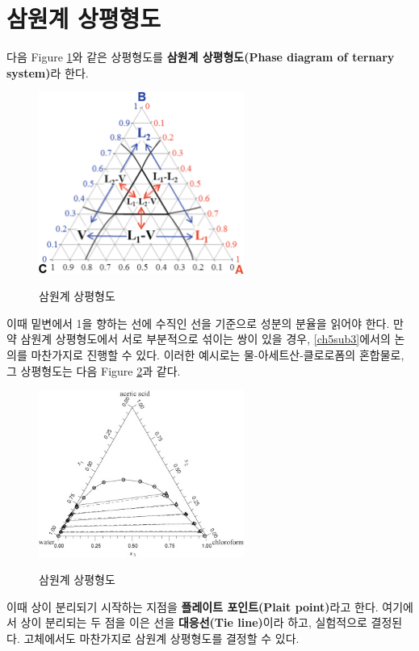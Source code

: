     \section{삼원계 상평형도}
        \hspace{\parindent} 다음 Figure \ref{f15}와 같은 상평형도를 
        \textbf{삼원계 상평형도(Phase diagram of ternary system)}라 한다.
        \begin{figure}[H]
            \centering
            \includegraphics[width=0.6\textwidth]{Images/ternary}
            \caption{삼원계 상평형도}\label{f15}\cite{SMITH2013175}
        \end{figure}
        이때 밑변에서 1을 향하는 선에 수직인 선을 기준으로 성분의 분율을 읽어야 한다. 만약 삼원계 상평형도에서 서로 부분적으로 섞이는 쌍이 있을 경우, \ref{ch5sub3}에서의 논의를 마찬가지로 
        진행할 수 있다. 이러한 예시로는 물-아세트산-클로로폼의 혼합물로, 그 상평형도는 다음 Figure \ref{f16}과 같다. 
        \begin{figure}[H]
            \centering
            \includegraphics[width=0.6\textwidth]{Images/wtcternary}
            \caption{삼원계 상평형도}\label{f16}\cite{SENOL200651}
        \end{figure}
        이때 상이 분리되기 시작하는 지점을 \textbf{플레이트 포인트(Plait point)}라고 한다. 여기에서 상이 분리되는 두 점을 이은 선을 \textbf{대응선(Tie line)}이라 하고, 실험적으로 결정된다.
        고체에서도 마찬가지로 삼원계 상평형도를 결정할 수 있다.
